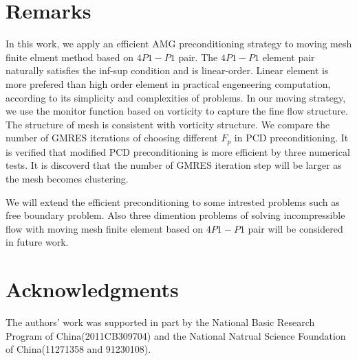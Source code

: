 \documentclass{eajam}
\begin{document}
\section{Remarks}
   \label{sec6} In this work, we apply an efficient AMG
   preconditioning strategy to moving mesh finite elment method based
   on $4P1-P1$ pair. The $4P1-P1$ element pair naturally satisfies the
   inf-sup condition and is linear-order. 
   Linear element is more prefered than high order element in
   practical engeneering computation, according to its simplicity and
   complexities of problems. In our moving strategy, we use the
   monitor function based on vorticity to capture the fine flow
   structure. The structure of mesh is consistent with vorticity
   structure. We compare the number of GMRES iterations of choosing
   different $F_p$ in PCD preconditioning. It is verified that
   modified PCD preconditioning is more efficient by three numerical
   tests. It is discoverd that the number of GMRES iteration step will
   be larger as the mesh becomes clustering. 
   
   We will extend the efficient preconditioning to some intrested 
   problems such as free boundary problem. Also three dimention
   problems of solving incompressible flow with moving mesh finite
   element based on $4P1-P1$ pair will be considered in future work. 

\section*{Acknowledgments}
The authors' work was supported in part by the National Basic Research
Program of China(2011CB309704) and the National Natrual Science
Foundation of China(11271358 and 91230108).
   




 
\end{document}

